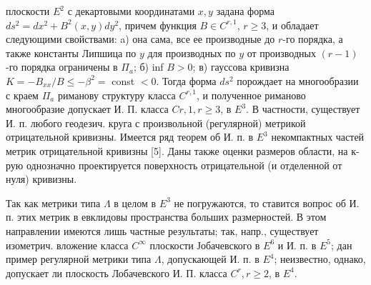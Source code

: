 \documentclass[10pt]{article}
\begin{document}
плоскости $E^{2}$ с декартовыми координатами $x, y$ задана форма $d s^{2}=d x^{2}+B^{2}(x, y) d y^{2}$, причем функция $B \in C^{r, 1}$, $r \geqslant 3$, и обладает следующими свойствами: a) она сама, все ее производные до $r$-го порядка, а также константы Липшица по $y$ для производных по $y$ от производных $(r-1)$-го порядка ограничены в $\Pi_{a}$; б) inf $B>0$; в) гауссова кривизна $K=-B_{x x} / B \leqslant-\beta^{2}=$ const $<0$. Тогда форма $d s^{2}$ порождает на многообразии с краем $\Pi_{a}$ риманову структуру класса $C^{r, 1}$, и полученное риманово многообразие допускает И. П. класса $C r, 1, r \geqslant 3$, в $E^{3}$. В частности, существует И. п. любого геодезич. круга с произвольной (регулярной) метрикой отрицательной кривизны. Имеется ряд теорем об И. п. в $E^{3}$ некомпактных частей метрик отрицательной кривизны [5]. Даны также оценки размеров области, на к-рую однозначно проектируется поверхность отрицательной (и отделенной от нуля) кривизны.



Так как метрики типа $\Lambda$ в целом в $E^{3}$ не погружаются, то ставится вопрос об И. п. этих метрик в евклидовы пространства больших размерностей. В этом направлении имеются лишь частные результаты; так, напр., существует изометрич. вложение класса $C^{\infty}$ плоскости Јобачевского в $E^{6}$ и И. п. в $E^{5}$; дан пример регулярной метрики типа $\Lambda$, допускающей И. п. в $E^{4}$; неизвестно, однако, допускает ли плоскость Лобачевского И. П. класса $C^{r}, r \geqslant 2$, в $E^{4}$.
\end{document}
